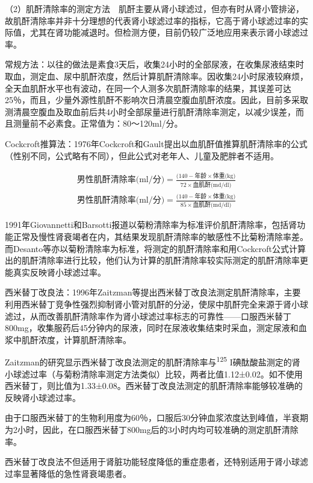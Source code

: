 （2）肌酐清除率的测定方法　肌酐主要从肾小球滤过，但亦有时从肾小管排泌，故肌酐清除率并非十分理想的代表肾小球滤过率的指标，它高于肾小球滤过率的实际值，尤其在肾功能减退时。但检测方便，目前仍较广泛地应用来表示肾小球滤过率。

常规方法：以往的做法是素食3天后，收集24小时的全部尿液，在收集尿液结束时取血，测定血、尿中肌酐浓度，然后计算肌酐清除率。因收集24小时尿液较麻烦，全天血肌酐水平也有波动，在同一个人测多次肌酐清除率的结果，其误差可达25％，而且，少量外源性肌酐不影响次日清晨空腹血肌酐浓度。因此，目前多采取测清晨空腹血及取血前后共4小时全部尿量进行肌酐清除率测定，以减少误差，而且测量前不必素食。正常值为：80～120ml/分。

Cockcroft推算法：1976年Cockcroft和Gault提出以血肌酐值推算肌酐清除率的公式（性别不同，公式略有不同），但此公式对老年人、儿童及肥胖者不适用。

\[
\begin{array}{l}
    \text{男性肌酐清除率(ml/分)}=\frac{(140-\text{年龄}\times \text{体重(kg)}}{72\times \text{血肌酐(md/dl)}}\\
    \text{男性肌酐清除率(ml/分)}=\frac{(140-\text{年龄}\times \text{体重(kg)}}{85\times \text{血肌酐(md/dl)}}
\end{array}    
\]

1991年Giovannetti和Barsotti报道以菊粉清除率为标准评价肌酐清除率，包括肾功能正常及慢性肾衰竭者在内，其结果发现肌酐清除率的敏感性不比菊粉清除率差。而Desanto等亦以菊粉清除率为标准，将测定的肌酐清除率和用Cockcroft公式计算出的肌酐清除率进行比较，他们认为计算的肌酐清除率较实际测定的肌酐清除率更能真实反映肾小球滤过率。

西米替丁改良法：1996年Zaitzman等提出西米替丁改良法测定肌酐清除率，主要利用西米替丁竞争性强烈抑制肾小管对肌酐的分泌，使尿中肌酐完全来源于肾小球滤过，从而改善肌酐清除率作为肾小球滤过率标志的可靠性------口服西米替丁800mg，收集服药后45分钟内的尿液，同时在尿液收集结束时采血，测定尿液和血浆中肌酐浓度，计算肌酐清除率。

Zaitzman的研究显示西米替丁改良法测定的肌酐清除率与\textsuperscript{125}
I碘酞酸盐测定的肾小球滤过率（与菊粉清除率测定方法类似）比较，两者比值1.12±0.02。如不使用西米替丁，则比值为1.33±0.08。西米替丁改良法测定的肌酐清除率能够较准确的反映肾小球滤过率。

由于口服西米替丁的生物利用度为60％，口服后30分钟血浆浓度达到峰值，半衰期为2小时，因此，在口服西米替丁800mg后的3小时内均可较准确的测定肌酐清除率。

西米替丁改良法不但适用于肾脏功能轻度降低的重症患者，还特别适用于肾小球滤过率显著降低的急性肾衰竭患者。

